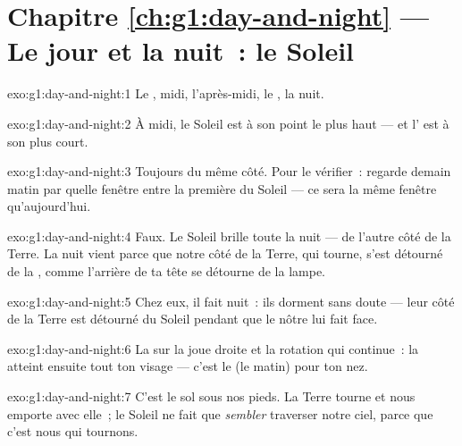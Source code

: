 \section*{Chapitre \ref{ch:g1:day-and-night} --- Le jour et la nuit~: le Soleil}

\begin{solution}{exo:g1:day-and-night:1}
Le , midi, l'après-midi, le , la
nuit.
\end{solution}

\begin{solution}{exo:g1:day-and-night:2}
À midi, le Soleil est à son point le plus haut --- et l' est à
son plus court.
\end{solution}

\begin{solution}{exo:g1:day-and-night:3}
Toujours du même côté. Pour le vérifier~: regarde demain matin par
quelle fenêtre entre la première  du Soleil --- ce sera la
même fenêtre qu'aujourd'hui.
\end{solution}

\begin{solution}{exo:g1:day-and-night:4}
Faux. Le Soleil brille toute la nuit --- de l'autre côté de la Terre.
La nuit vient parce que notre côté de la Terre, qui tourne, s'est
détourné de la , comme l'arrière de ta tête se détourne de la
lampe.
\end{solution}

\begin{solution}{exo:g1:day-and-night:5}
Chez eux, il fait nuit~: ils dorment sans doute --- leur côté de la
Terre est détourné du Soleil pendant que le nôtre lui fait face.
\end{solution}

\begin{solution}{exo:g1:day-and-night:6}
La  sur la joue droite et la rotation qui continue~: la
 atteint ensuite tout ton visage --- c'est le 
(le matin) pour ton nez.
\end{solution}

\begin{solution}{exo:g1:day-and-night:7}
C'est le sol sous nos pieds. La Terre tourne et nous emporte avec
elle~; le Soleil ne fait que \emph{sembler} traverser notre ciel,
parce que c'est nous qui tournons.
\end{solution}


